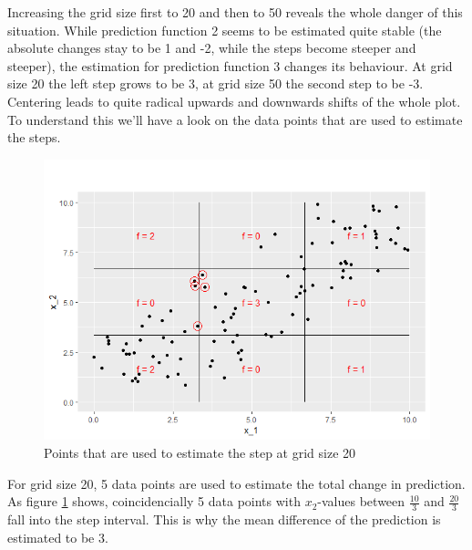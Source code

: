 \documentclass[
]{krantz}
\begin{document}
Increasing the grid size first to 20 and then to 50 reveals the whole danger of this situation. While prediction function 2 seems to be estimated quite stable (the absolute changes stay to be 1 and -2, while the steps become steeper and steeper), the estimation for prediction function 3 changes its behaviour. At grid size 20 the left step grows to be 3, at grid size 50 the second step to be -3. Centering leads to quite radical upwards and downwards shifts of the whole plot.
To understand this we'll have a look on the data points that are used to estimate the steps.

\begin{figure}
\includegraphics[width=1\linewidth]{images/ALE_2_pwc_example5_critical_points2_} \caption{Points that are used to estimate the step at grid size 20}\label{fig:ALE2pwcexample5criticalpoints2}
\end{figure}



For grid size 20, 5 data points are used to estimate the total change in prediction. As figure \ref{fig:ALE2pwcexample5criticalpoints2} shows, coincidencially 5 data points with \(x_2\)-values between \(\frac{10}{3}\) and \(\frac{20}{3}\) fall into the step interval. This is why the mean difference of the prediction is estimated to be 3.
\end{document}
